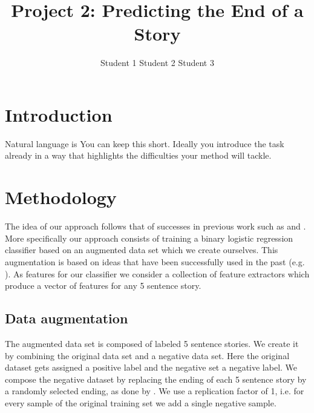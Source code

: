 \documentclass{article}
\title{Project 2: Predicting the End of a Story}
\author{Student 1 \qquad Student 2 \qquad Student 3}
\begin{document}

\maketitle



\section{Introduction}
\label{sec:intro}

Natural language is
You can keep this short. Ideally you introduce the task already in a way that highlights the difficulties  your method will tackle.

\section{Methodology}
The idea of our approach follows that of successes in previous work such as \cite{UWNLP} and \cite{COGCOMP}. More specifically our approach consists of training a binary logistic regression classifier based on an augmented data set which we create ourselves. This augmentation is based on ideas that have been successfully used in the past (e.g. \cite{LSTMClassifier}). As features for our classifier we consider a collection of feature extractors which produce a vector of features for any 5 sentence story.

\subsection{Data augmentation}
The augmented data set is composed of labeled 5 sentence stories. We create it by combining the original data set and a negative data set. Here the original dataset gets assigned a positive label and the negative set a negative label. We compose the negative dataset by replacing the ending of each 5 sentence story by a randomly selected ending, as done by \cite{LSTMClassifier}. We use a replication factor of 1, i.e. for every sample of the original training set we add a single negative sample.
\end{document}
